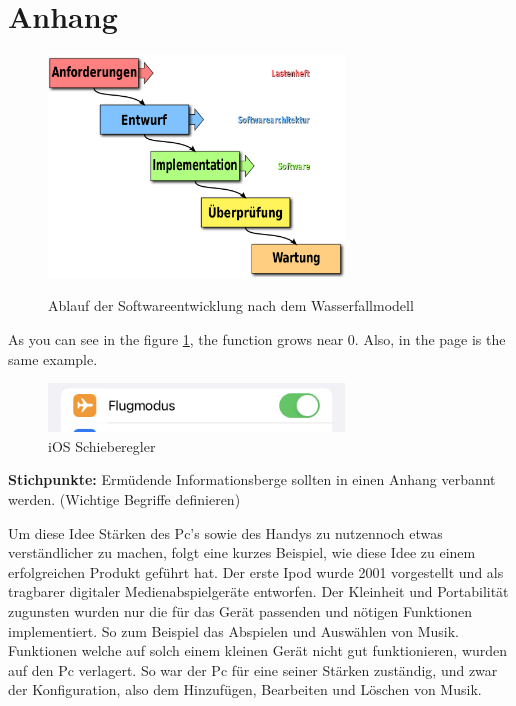 \section{Anhang}

\begin{figure}[h]
    \centering
    \includegraphics[width=0.7\textwidth]{res/Waterfall_model-de.svg.png} 
    \caption{Ablauf der Softwareentwicklung nach dem Wasserfallmodell} \cite{wasserfallmodellPic}
    \label{fig:wasserfallmodell}
\end{figure}

As you can see in the figure \ref{fig:wasserfallmodell}, the 
function grows near 0. Also, in the page \pageref{fig:wasserfallmodell} 
is the same example.

\myNewSection
\begin{figure}[h]
    \centering
    \includegraphics[width=0.7\textwidth]{res/IMG_A9A2347E0F7D-1.jpeg} 
    \caption{iOS Schieberegler} 
    \label{pic:schieberegler}
\end{figure}
\myNewSection
\textbf{Stichpunkte:} 
Ermüdende Informationsberge sollten in einen Anhang verbannt werden. (Wichtige Begriffe definieren)

\myNewSection \label{anhang:einleitung:passendeLösung}
Um diese Idee \dq Stärken des Pc's sowie des Handys zu nutzen\dq noch etwas verständlicher zu machen, folgt eine kurzes Beispiel, wie diese Idee zu einem erfolgreichen Produkt geführt hat.
Der erste Ipod\cite{einleitung_ipod} wurde 2001 vorgestellt und als \glqq tragbarer digitaler Medienabspielgeräte\grqq{} entworfen. Der Kleinheit und Portabilität zugunsten wurden nur die für das Gerät passenden und nötigen Funktionen implementiert. So zum Beispiel das Abspielen und Auswählen von Musik. Funktionen welche auf solch einem kleinen Gerät nicht gut funktionieren, wurden auf den Pc verlagert. So war der Pc für eine seiner Stärken zuständig, und zwar der Konfiguration, also dem Hinzufügen, Bearbeiten und Löschen von Musik. 